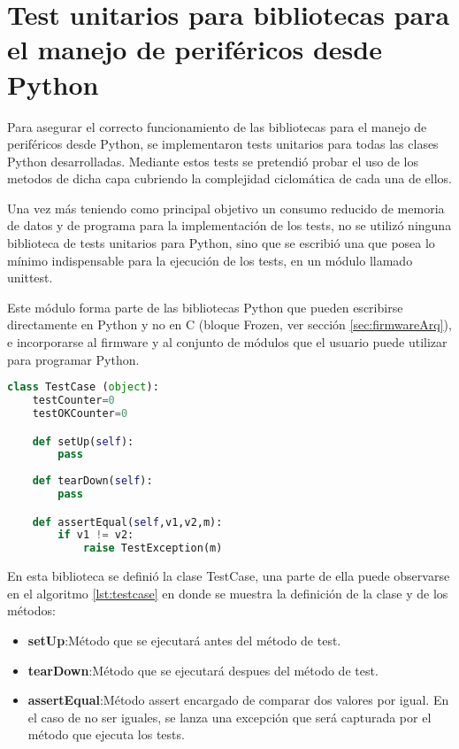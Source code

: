 \section{Test unitarios para bibliotecas para el manejo de periféricos desde Python}
\label{sec:testUnitariosPython}

Para asegurar el correcto funcionamiento de las bibliotecas para el manejo de periféricos desde Python, se implementaron tests unitarios para todas las clases Python desarrolladas. Mediante estos tests se pretendió probar el uso de los metodos de dicha capa cubriendo la complejidad ciclomática de cada una de ellos.

Una vez más teniendo como principal objetivo un consumo reducido de memoria de datos y de programa para la implementación de los tests, no se utilizó ninguna biblioteca de tests unitarios para Python, sino que se escribió una que posea lo mínimo indispensable para la ejecución de los tests, en un módulo llamado unittest. 

Este módulo forma parte de las bibliotecas Python que pueden escribirse directamente en Python y no en C (bloque Frozen, ver sección \ref{sec:firmwareArq}), e incorporarse al firmware y al conjunto de módulos que el usuario puede utilizar para programar Python.

\begin{lstlisting}[label={lst:testcase},caption=Clase TestCase utilizada para crear tests unitarios para Python., language={python}]
class TestCase (object):
    testCounter=0
    testOKCounter=0

    def setUp(self):
        pass
    
    def tearDown(self):
        pass

    def assertEqual(self,v1,v2,m):
        if v1 != v2:
            raise TestException(m)
\end{lstlisting}

En esta biblioteca se definió la clase TestCase, una parte de ella puede observarse en el algoritmo \ref{lst:testcase} en donde se muestra la definición de la clase y de los métodos:

\begin{itemize}
	\item \textbf{setUp}:Método que se ejecutará antes del método de test.
	\item \textbf{tearDown}:Método que se ejecutará despues del método de test.
	\item \textbf{assertEqual}:Método assert encargado de comparar dos valores por igual. En el caso de no ser iguales, se lanza una excepción que será capturada por el método que ejecuta los tests.
\end{itemize}

